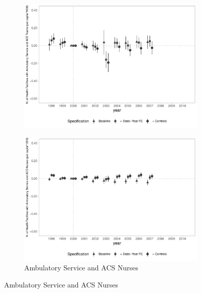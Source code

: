 \begin{figure}[h]
\begin{center}
\begin{subfigure}{0.24\textwidth}
        \includegraphics[width=\textwidth]{plots/infra/sia_ncnes_acs_pcapita_dist_ec29_baseline_dist_ec29_baseline_full.pdf}
    \end{subfigure}
    \begin{subfigure}{0.24\textwidth}
        \centering
        \caption{\tiny Ambulatory Service and ACS Nurses}\label{fig:infra_p}
        \includegraphics[width=\textwidth]{plots/infra/sia_ncnes_enfacs_pcapita_dist_ec29_baseline_dist_ec29_baseline_full.pdf}
    \end{subfigure}
    
    \end{center}
    
\end{figure}


